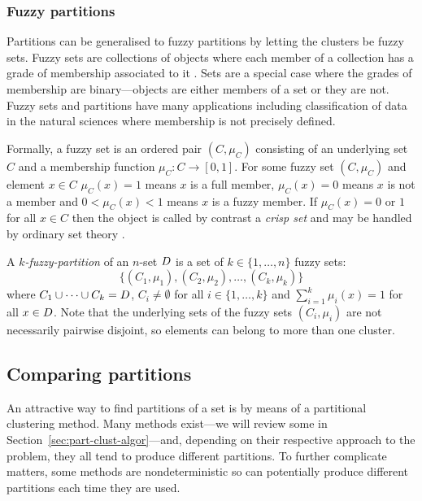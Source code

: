 \subsubsection{Fuzzy partitions}
\label{sec:fuzzy-partitions}

Partitions can be generalised to fuzzy partitions by letting the clusters be
fuzzy sets.  Fuzzy sets are collections of objects where each member of a
collection has a grade of membership associated to it \citep{zadeh1965fuzzy}.
Sets are a special case where the grades of membership are binary---objects
are either members of a set or they are not.  Fuzzy sets and partitions have
many applications including classification of data in the natural sciences
where membership is not precisely defined.

Formally, a fuzzy set is an ordered pair $(C,\mu_{C})$ consisting of an
underlying set $C$ and a membership function $\mu_{C} \colon C \to [0,1]$.
For some fuzzy set $(C,\mu_C)$ and element $x \in C$ $\mu_C(x) = 1$ means $x$
is a full member, $\mu_C(x) = 0$ means $x$ is not a member and $0 < \mu_C(x) <
1$ means $x$ is a fuzzy member.  If $\mu_C(x) = 0$ or $1$ for all $x \in C$
then the object is called by contrast a \textit{crisp set} and may be handled
by ordinary set theory \cite{zadeh1965fuzzy,klir1995fuzzy}.

A \textit{$k$-fuzzy-partition} of an $n$-set $D$ is a set of $k \in
\{1,\dotsc,n\}$ fuzzy sets: \[\{(C_1,\mu_1),(C_2,\mu_2),\dotsc,(C_k,\mu_k)\}\]
where $C_1 \cup \dotsb \cup C_k = D$, $C_i \neq \emptyset$ for all $i \in
\{1,\dotsc,k\}$ and $\sum_{i=1}^{k} \mu_i(x) = 1$ for all $x \in D$.  Note
that the underlying sets of the fuzzy sets $(C_i,\mu_i)$ are not necessarily
pairwise disjoint, so elements can belong to more than one cluster.

\subsection{Comparing partitions}
\label{sec:comparing-partitions}

An attractive way to find partitions of a set is by means of a partitional
clustering method.  Many methods exist---we will review some in
Section~\ref{sec:part-clust-algor}---and, depending on their respective
approach to the problem, they all tend to produce different partitions.  To
further complicate matters, some methods are nondeterministic so can
potentially produce different partitions each time they are used.


